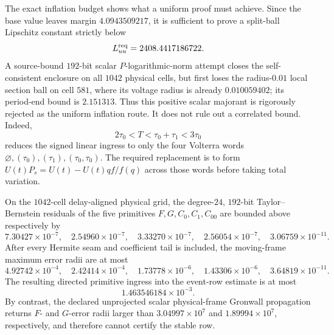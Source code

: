 The exact inflation budget shows what a uniform proof must achieve.  Since
the base value leaves margin \(4.0943509217\), it is sufficient to prove a
split-ball Lipschitz constant strictly below
\[
 L_{uu}^{\rm req}=2408.4417186722.
\]
A source-bound \(192\)-bit scalar \(P\)-logarithmic-norm attempt closes the
self-consistent enclosure on all \(1042\) physical cells, but first loses
the radius-\(0.01\) local section ball on cell \(581\), where its voltage
radius is already \(0.010059402\); its period-end bound is \(2.151313\).
Thus this positive scalar majorant is rigorously rejected as the uniform
inflation route.  It does not rule out a correlated bound.  Indeed,
\[
 2\tau_0<T<\tau_0+\tau_1<3\tau_0
\]
reduces the signed linear ingress to only the four Volterra words
\(\varnothing,(\tau_0),(\tau_1),(\tau_0,\tau_0)\).  The required replacement
is to form \(U(t)P_s=U(t)-U(t)qf/f(q)\) across those words before taking
total variation.

\begin{proposition}
\label{prop:inner-primitive-ingress}
On the \(1042\)-cell delay-aligned physical grid, the degree-\(24\),
\(192\)-bit Taylor--Bernstein residuals of the five primitives
\(F,G,C_0,C_1,C_{00}\) are bounded above respectively by
\[
 7.30427\times10^{-7},\quad
 2.54960\times10^{-7},\quad
 3.33270\times10^{-7},\quad
 2.56054\times10^{-7},\quad
 3.06759\times10^{-11}.
\]
After every Hermite seam and coefficient tail is included, the moving-frame
maximum error radii are at most
\[
 4.92742\times10^{-4},\quad
 2.42414\times10^{-4},\quad
 1.73778\times10^{-6},\quad
 1.43306\times10^{-6},\quad
 3.64819\times10^{-11}.
\]
The resulting directed primitive ingress into the event-row estimate is at
most
\begin{equation}
 1.463546184\times10^{-3}.                             \label{eq:primitive-ingress}
\end{equation}
By contrast, the declared unprojected scalar physical-frame Gronwall
propagation returns \(F\)- and \(G\)-error radii larger than
\(3.04997\times10^7\) and \(1.89994\times10^7\), respectively, and
therefore cannot certify the stable row.
\end{proposition}

